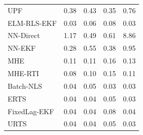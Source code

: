 \begin{longtable}{lrrrr}
UPF & 0.38 & 0.43 & 0.35 & 0.76 \\
ELM-RLS-EKF & 0.03 & 0.06 & 0.08 & 0.03 \\
NN-Direct & 1.17 & 0.49 & 0.61 & 8.86 \\
NN-EKF & 0.28 & 0.55 & 0.38 & 0.95 \\
MHE & 0.11 & 0.11 & 0.16 & 0.13 \\
MHE-RTI & 0.08 & 0.10 & 0.15 & 0.11 \\
Batch-NLS & 0.04 & 0.05 & 0.03 & 0.03 \\
ERTS & 0.04 & 0.04 & 0.05 & 0.03 \\
FixedLag-EKF & 0.04 & 0.04 & 0.08 & 0.04 \\
URTS & 0.04 & 0.04 & 0.05 & 0.03 \\
\bottomrule\end{longtable}
